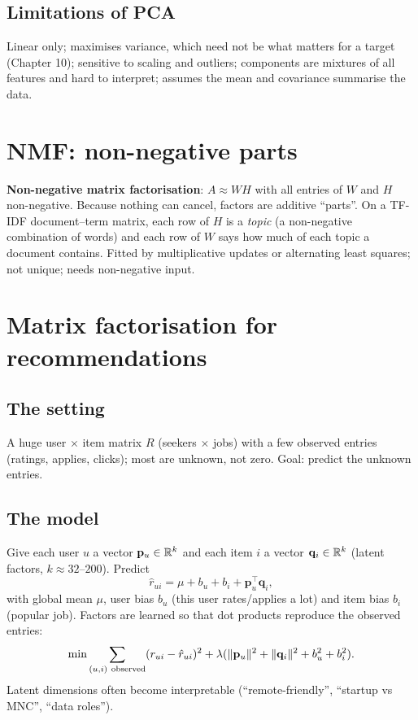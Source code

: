 \subsection{Limitations of PCA}
Linear only; maximises variance, which need not be what matters for a target (Chapter 10); sensitive to scaling and outliers; components
are mixtures of all features and hard to interpret; assumes the mean and covariance summarise the data.

\section{NMF: non-negative parts}
\textbf{Non-negative matrix factorisation}: $A\approx WH$ with all entries of $W$ and $H$ non-negative. Because nothing can cancel,
factors are additive ``parts''. On a TF-IDF document--term matrix, each row of $H$ is a \emph{topic} (a non-negative combination of words) and
each row of $W$ says how much of each topic a document contains. Fitted by multiplicative updates or alternating least squares; not unique;
needs non-negative input.

\section{Matrix factorisation for recommendations}
\subsection{The setting}
A huge user $\times$ item matrix $R$ (seekers $\times$ jobs) with a few observed entries (ratings, applies, clicks); most are unknown, not zero.
Goal: predict the unknown entries.

\subsection{The model}
Give each user $u$ a vector $\mathbf p_u\in\mathbb{R}^k$ and each item $i$ a vector $\mathbf q_i\in\mathbb{R}^k$ (latent factors, $k\approx 32$--$200$). Predict
\[ \hat r_{ui} = \mu + b_u + b_i + \mathbf p_u^\top\mathbf q_i, \]
with global mean $\mu$, user bias $b_u$ (this user rates/applies a lot) and item bias $b_i$ (popular job). Factors are learned so that
dot products reproduce the observed entries:
\[ \min\sum_{(u,i)\ \text{observed}}(r_{ui} - \hat r_{ui})^2 + \lambda(\norm{\mathbf p_u}^2 + \norm{\mathbf q_i}^2 + b_u^2 + b_i^2). \]
Latent dimensions often become interpretable (``remote-friendly'', ``startup vs MNC'', ``data roles'').

